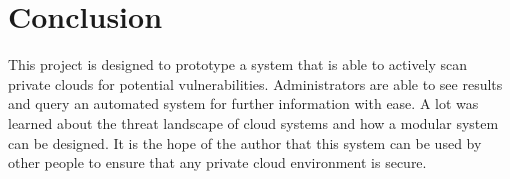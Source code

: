 \documentclass[12pt]{article}
\begin{document}
\section{Conclusion}
This project is designed to prototype a system that is able to actively scan private clouds for potential vulnerabilities. Administrators are able to see results and query an automated system for further information with ease. A lot was learned about the threat landscape of cloud systems and how a modular system can be designed. It is the hope of the author that this system can be used by other people to ensure that any private cloud environment is secure.


\newpage


\newpage
\appendix
\section{}

\end{document}
